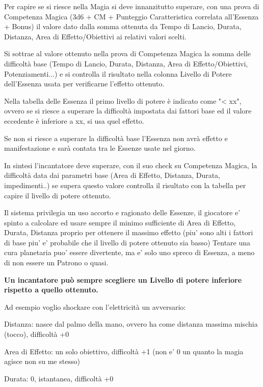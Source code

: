 \documentclass[a4paper,10 pt,twoside,openany]{book}
\begin{document}
\label{riuscire-e-fallire-nella-prova-di-magia}

Per capire se si riesce nella Magia si deve innanzitutto superare, con una prova di Competenza Magica (3d6 + CM + Punteggio Caratteristica correlata all'Essenza + Bonus) il valore dato dalla somma ottenuta da Tempo di Lancio, Durata, Distanza, Area di Effetto/Obiettivi ai relativi valori scelti.

Si sottrae al valore ottenuto nella prova di Competenza Magica la somma delle difficoltà base (Tempo di Lancio, Durata, Distanza, Area di Effetto/Obiettivi, Potenziamenti...) e si controlla il risultato nella colonna Livello di Potere dell'Essenza usata per verificarne l'effetto ottenuto.

Nella tabella delle Essenza il primo livello di potere è indicato come "< xx", ovvero se si riesce a superare la difficoltà impostata dai fattori base ed il valore eccedente è inferiore a xx, si usa quel effetto.

Se non si riesce a superare la difficoltà base l'Essenza non avrà effetto e manifestazione e sarà contata tra le Essenze usate nel giorno.

In sintesi l'incantatore deve superare, con il suo check su Competenza Magica, la difficoltà data dai parametri base (Area di Effetto, Distanza, Durata, impedimenti..) se supera questo valore controlla il risultato con la tabella per capire il livello di potere ottenuto.

Il sistema privilegia un uso accorto e ragionato delle Essenze, il giocatore e' spinto a calcolare ed usare sempre il minimo sufficiente di Area di Effetto, Durata, Distanza proprio per ottenere il massimo effetto (piu' sono alti i fattori di base piu' e' probabile che il livello di potere ottenuto sia basso)
Tentare una cura planetaria puo' essere divertente, ma e' solo uno spreco di Essenza, a meno di non essere un Patrono o quasi.

\bigskip

\textbf{Un incantatore può sempre scegliere un Livello di potere inferiore rispetto a quello ottenuto.}

Ad esempio voglio shockare con l'elettricità un avversario:

Distanza: nasce dal palmo della mano, ovvero ha come distanza massima mischia (tocco), difficoltà +0

Area di Effetto: un solo obiettivo, difficoltà +1 (non e' 0 un quanto la magia agisce non su me stesso)

Durata: 0, istantanea, difficoltà +0
\end{document}
